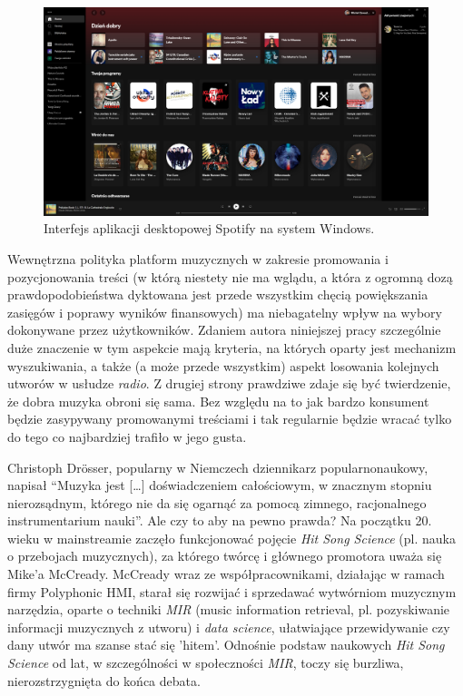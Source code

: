 \documentclass[a4paper,12pt]{article}
\numberwithin{figure}{section}
\begin{document}
    \bigskip

    \begin{figure}[H]
        \centering
        \includegraphics[width=\textwidth]{spotify_desktop_app_interface}
        \caption{Interfejs aplikacji desktopowej Spotify na system Windows.}
        \label{fig:spotify_desktop_app_interface}
    \end{figure}

    \bigskip

    Wewnętrzna polityka platform muzycznych w zakresie promowania i pozycjonowania treści (w którą niestety nie ma wglądu, a która z ogromną dozą prawdopodobieństwa dyktowana jest przede wszystkim chęcią powiększania zasięgów i poprawy wyników finansowych) ma niebagatelny wpływ na wybory dokonywane przez użytkowników\cite{PreferencjeMuzyczneWCzasachSteamingu2020}. Zdaniem autora niniejszej pracy szczególnie duże znaczenie w tym aspekcie mają kryteria, na których oparty jest mechanizm wyszukiwania, a także (a może przede wszystkim) aspekt losowania kolejnych utworów w usłudze \textit{radio}. Z drugiej strony prawdziwe zdaje się być twierdzenie, że dobra muzyka obroni się sama. Bez względu na to jak bardzo konsument będzie zasypywany promowanymi treściami i tak regularnie będzie wracać tylko do tego co najbardziej trafiło w jego gusta.

    \bigskip

    Christoph Dr{ö}sser, popularny w Niemczech dziennikarz popularnonaukowy, napisał ``Muzyka jest [\ldots] doświadczeniem całościowym, w znacznym stopniu nierozsądnym, którego nie da się ogarnąć za pomocą zimnego, racjonalnego instrumentarium nauki''\cite{MuzykaDajSieUwiesc2021}. Ale czy to aby na pewno prawda? Na początku 20. wieku w mainstreamie zaczęło funkcjonować pojęcie \textit{Hit Song Science} (pl. nauka o przebojach muzycznych), za którego twórcę i głównego promotora uważa się Mike'a McCready\cite{HitSongScienceWiki}. McCready wraz ze współpracownikami, działając w ramach firmy Polyphonic HMI, starał się rozwijać i sprzedawać wytwórniom muzycznym narzędzia, oparte o techniki \textit{MIR} (music information retrieval, pl. pozyskiwanie informacji muzycznych z utworu) i \textit{data science}, ułatwiające przewidywanie czy dany utwór ma szanse stać się 'hitem'\cite{PolyphonicHMIWiki}. Odnośnie podstaw naukowych \textit{Hit Song Science} od lat, w szczególności w społeczności \textit{MIR}, toczy się burzliwa, nierozstrzygnięta do końca debata\cite{HitSongScienceWiki}.
\end{document}
